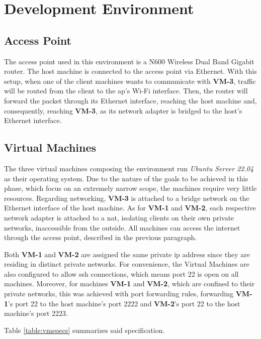 \documentclass[11pt,twoside,a4paper]{report}
\begin{document}
\section{Development Environment}

\subsection{Access Point}

The access point used in this environment is a N600 Wireless Dual Band Gigabit router. The host machine is connected to the access point via Ethernet. With this setup, when one of the client machines wants to communicate with \textbf{VM-3}, traffic will be routed from the client to the \ac{ap}'s Wi-Fi interface. Then, the router will forward the packet through its Ethernet interface, reaching the host machine and, consequently, reaching \textbf{VM-3}, as its network adapter is bridged to the host's Ethernet interface.

\subsection{Virtual Machines}

The three virtual machines composing the environment run \emph{Ubuntu Server 22.04} as their operating system. Due to the nature of the goals to be achieved in this phase, which focus on an extremely narrow scope, the machines require very little resources. Regarding networking, \textbf{VM-3} is attached to a bridge network on the Ethernet interface of the host machine. As for \textbf{VM-1} and \textbf{VM-2}, each respective network adapter is attached to a \ac{nat}, isolating clients on their own private networks, inaccessible from the outside. All machines can access the internet through the access point, described in the previous paragraph.

Both \textbf{VM-1} and \textbf{VM-2} are assigned the same private \ac{ip} address since they are residing in distinct private networks. For convenience, the Virtual Machines are also configured to allow \ac{ssh} connections, which means port 22 is open on all machines. Moreover, for machines \textbf{VM-1} and \textbf{VM-2}, which are confined to their private networks, this was achieved with port forwarding rules, forwarding \textbf{VM-1}'s port 22 to the host machine's port 2222 and \textbf{VM-2}'s port 22 to the host machine's port 2223.

Table \ref{table:vmspecs} summarizes said specification.
\end{document}
